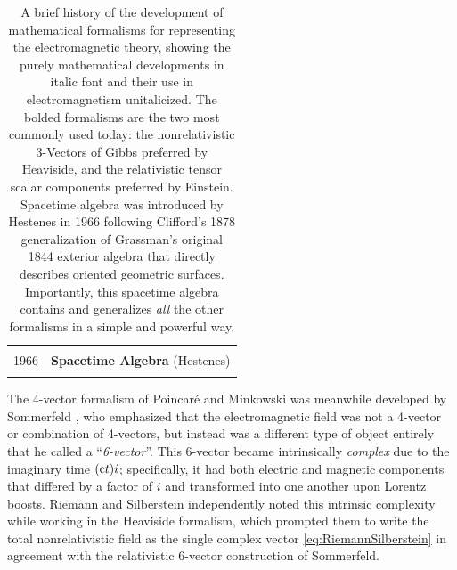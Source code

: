 \documentclass[1p,sort&compress]{elsarticle}
\numberwithin{equation}{section}
\newcommand{\cc}{{\rm c}}
\begin{document}
\begin{table}
\begin{tabular}{ l  l  r }
    \hline
    \\
    1966 & \multicolumn{2}{c}{\textbf{Spacetime Algebra} (Hestenes)} \\
    \\
    \hline 
 \end{tabular}
 \caption[History of electromagnetic formalisms]{A brief history of the development of mathematical formalisms for representing the electromagnetic theory, showing the purely mathematical developments in italic font and their use in electromagnetism unitalicized.  The bolded formalisms are the two most commonly used today: the nonrelativistic 3-Vectors of Gibbs preferred by Heaviside, and the relativistic tensor scalar components preferred by Einstein.  Spacetime algebra was introduced by Hestenes in 1966 following Clifford's 1878 generalization of Grassman's original 1844 exterior algebra that directly describes oriented geometric surfaces. Importantly, this spacetime algebra contains and generalizes \emph{all} the other formalisms in a simple and powerful way. }
 \label{tab:history}
\end{table}

The 4-vector formalism of Poincar\'e and Minkowski was meanwhile developed by Sommerfeld \cite{Sommerfeld1910,Sommerfeld1910b}, who emphasized that the electromagnetic field was not a 4-vector or combination of 4-vectors, but instead was a different type of object entirely that he called a ``\emph{6-vector}''.  This 6-vector became intrinsically \emph{complex} due to the imaginary time $(\cc t)i$; specifically, it had both electric and magnetic components that differed by a factor of $i$ and transformed into one another upon Lorentz boosts.  Riemann \cite{Weber1901} and Silberstein \cite{Silberstein1907a,Silberstein1907b} independently noted this intrinsic complexity while working in the Heaviside formalism, which prompted them to write the total nonrelativistic field as the single complex vector
\eqref{eq:RiemannSilberstein} in agreement with the relativistic 6-vector construction of Sommerfeld.  
\end{document}
